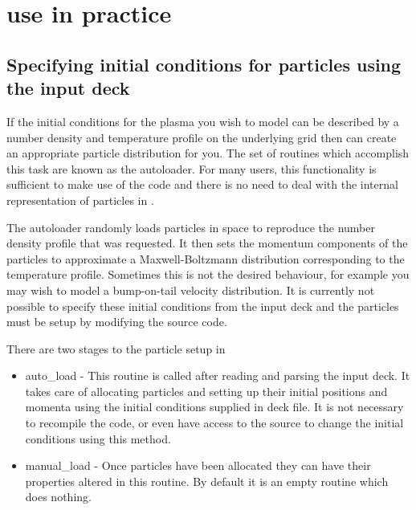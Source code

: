 \section{{\EPOCH} use in practice}
\label{sec:usage}

\subsection{Specifying initial conditions for particles using the input deck}

If the initial conditions for the plasma you wish to model can be described
by a number density and temperature profile on the underlying grid then
{\EPOCH} can create an appropriate particle distribution for you. The
set of routines which accomplish this task are known as the autoloader.
For many users, this functionality is sufficient to make use of the
code and there is no need to deal with the internal representation of
particles in {\EPOCH}.

The autoloader randomly loads particles in space to reproduce the number
density profile that was requested. It then sets the momentum components
of the particles to approximate a Maxwell-Boltzmann distribution
corresponding to the temperature profile. Sometimes this is not the
desired behaviour, for example you may wish to model a bump-on-tail
velocity distribution. It is currently not possible to specify these
initial conditions from the input deck and the particles must be setup
by modifying the source code.

There are two stages to the particle setup in {\EPOCH}

\begin{itemize}
\item auto\_load - This routine is called after reading and parsing the
  input deck. It takes care of allocating particles and setting up their
  initial positions and momenta using the initial conditions supplied in
  deck file.
  It is not necessary to recompile the code, or even have
  access to the source to change the initial conditions using this method.
\item manual\_load - Once particles have been allocated they can have their
  properties altered in this routine. By default it is an empty routine
  which does nothing.
\end{itemize}

